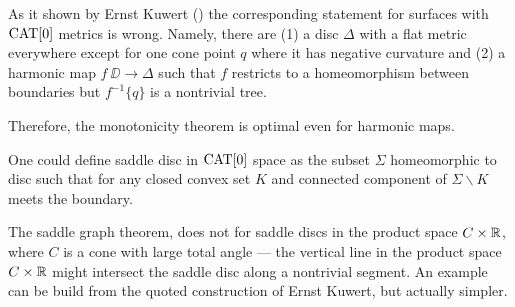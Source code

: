 \documentclass{article}
\begin{document}
As it shown by Ernst Kuwert (\cite[Theorem 3]{Ku}) the corresponding statement for surfaces with $\mathop{\rm CAT}\nolimits[0]$ metrics is wrong. 
Namely, there are (1) a disc $\Delta$ with a flat metric everywhere except for one cone point $q$ where it has negative curvature and (2) a harmonic map $f\:\DD\to \Delta$ such that $f$ restricts to a homeomorphism between boundaries but $f^{-1}\{q\}$ is a nontrivial tree.

Therefore, the monotonicity theorem is optimal even for harmonic maps.

One could define saddle disc in $\mathop{\rm CAT}\nolimits[0]$ space as the subset $\Sigma$ homeomorphic to disc such that for any closed convex set $K$ and connected component of $\Sigma\backslash K$ meets the boundary.

The saddle graph theorem, does not for saddle discs in the product space $C\times \mathbb{R}$, where $C$ is a cone with large total angle --- the vertical line in the product space $C\times \mathbb{R}$ might intersect the saddle disc along a nontrivial segment.
An example can be build from the quoted construction of Ernst Kuwert, but actually simpler.
\end{document}
